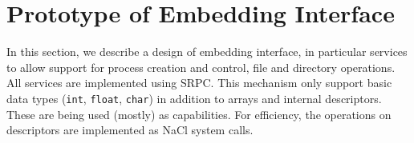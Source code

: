 \section{Prototype of Embedding Interface}
\label{sec:prototype}





In this section, we describe a design of embedding interface, in
particular services to allow support for process creation and control,
file and directory operations.  All services are implemented using SRPC.
This mechanism only support basic data types (\ie \lstinline`int`,
\lstinline`float`, \lstinline`char`) in addition to arrays and internal
descriptors. These are being used (mostly) as capabilities. For
efficiency, the operations on descriptors are implemented as NaCl system
calls.

